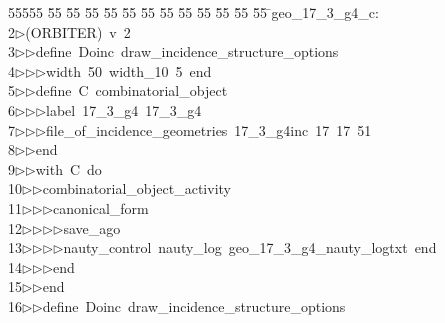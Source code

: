%
%
\begin{tabbing}
55555 \= 55 \= 55 \= 55 \= 55 \= 55 \= 55 \= 55 \= 55 \= 55 \= 55 \= 55 \= 55 \= \>geo\_17\_3\_g4\_c:\\[0pt]
2\>$\triangleright$\>(ORBITER)\ v\ 2\ \\[0pt]
3\>$\triangleright$\>$\triangleright$\>define\ Doinc\ draw\_incidence\_structure\_options\ \\[0pt]
4\>$\triangleright$\>$\triangleright$\>$\triangleright$\>width\ 50\ width\_10\ 5\ end\ \\[0pt]
5\>$\triangleright$\>$\triangleright$\>define\ C\ combinatorial\_object\ \\[0pt]
6\>$\triangleright$\>$\triangleright$\>$\triangleright$\>label\ 17\_3\_g4\ 17\_3\_g4\ \\[0pt]
7\>$\triangleright$\>$\triangleright$\>$\triangleright$\>file\_of\_incidence\_geometries\ 17\_3\_g4inc\ 17\ 17\ 51\ \\[0pt]
8\>$\triangleright$\>$\triangleright$\>end\ \\[0pt]
9\>$\triangleright$\>$\triangleright$\>with\ C\ do\ \\[0pt]
10\>$\triangleright$\>$\triangleright$\>combinatorial\_object\_activity\ \\[0pt]
11\>$\triangleright$\>$\triangleright$\>$\triangleright$\>canonical\_form\ \\[0pt]
12\>$\triangleright$\>$\triangleright$\>$\triangleright$\>$\triangleright$\>save\_ago\ \\[0pt]
13\>$\triangleright$\>$\triangleright$\>$\triangleright$\>$\triangleright$\>nauty\_control\ nauty\_log\ geo\_17\_3\_g4\_nauty\_logtxt\ end\ \\[0pt]
14\>$\triangleright$\>$\triangleright$\>$\triangleright$\>end\ \\[0pt]
15\>$\triangleright$\>$\triangleright$\>end\ \\[0pt]
16\>$\triangleright$\>$\triangleright$\>define\ Doinc\ draw\_incidence\_structure\_options\ \\[0pt]

\end{tabbing}

